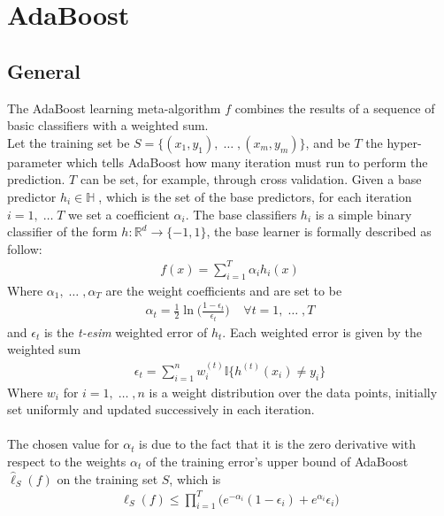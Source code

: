 
\chapter{AdaBoost}
\section{General}
	The AdaBoost learning meta-algorithm $f$ combines the results of a sequence of basic classifiers with a weighted sum. \\
	Let the training set be $S=\lbrace (x_{1}, y_{1}),\; \dots\;, (x_{m}, y_{m}) \rbrace$, and be $T$ the hyper-parameter which tells AdaBoost how many iteration must run to perform the prediction. $T$ can be set, for example, through cross validation. Given a base predictor $h_{i} \in \mathbb{H}\;$, which is the set of the base predictors, for each iteration $i = 1,\;\dots\;T$ we set a coefficient $\alpha_{i}$. The base classifiers $h_{i}$ is a simple binary classifier of the form $h:\mathbb{R}^{d}\to\lbrace-1, 1\rbrace$, the base learner is formally described as follow:
	\begin{align*}
		f(x) = \sum_{i=1}^{T}\alpha_{i}h_{i}(x)
	\end{align*}
	Where $\alpha_{1},\;\dots\;,\alpha_{T}$ are the weight coefficients and are set to be
	\begin{align*}
		\alpha_{t} = \frac{1}{2}\ln \Big( \frac{1-\epsilon_{t}}{\epsilon_{t}} \Big) \;\;\;\; \forall t=1,\;\dots\;,T
	\end{align*}
	and $\epsilon_{t}$ is the \textit{t-esim} weighted error of $h_{t}$. Each weighted error is given by the weighted sum
	\begin{align*}
		\epsilon_{t} = \sum_{i=1}^{n} w_{i}^{(t)}\mathbb{I}\big\lbrace h^{(t)}(x_{i}) \neq y_{i} \big\rbrace
	\end{align*}
	Where $w_{i}$ for $i = 1,\;\dots\;, n$ is a weight distribution over the data points, initially set uniformly and updated successively in each iteration.\\\\
	The chosen value for $\alpha_{t}$ is due to the fact that it is the zero derivative with respect to the weights $\alpha_{t}$ of the training error's upper bound of AdaBoost $\hat{\ell}_{S}(f)$ on the training set $S$, which is
	\begin{align*}
		\hat{\ell}_{S}(f) \leq \prod_{i=1}^{T}\big( e^{-\alpha_{i}}(1-\epsilon_{i}) + e^{\alpha_{i}}\epsilon_{i} \big)
	\end{align*}
	
